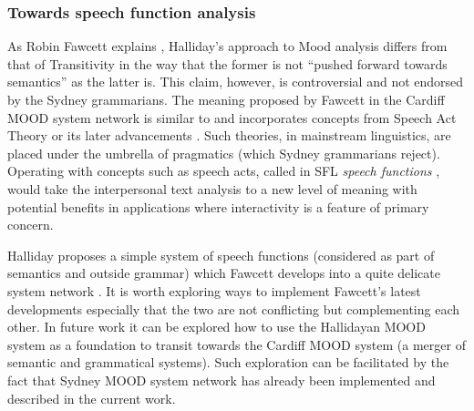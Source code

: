 \subsubsection{Towards speech function analysis}

    As Robin Fawcett explains \citep{Fawcett2011}, Halliday's approach to Mood analysis differs from that of Transitivity in the way that the former is not ``pushed forward towards semantics'' as the latter is. This claim, however, is controversial and not endorsed by the Sydney grammarians. %
    The meaning proposed by Fawcett in the Cardiff MOOD system network is similar to and incorporates concepts from Speech Act Theory \citep{Austin1975} or its later advancements \citep{Searle1969}. Such theories, in mainstream linguistics, are placed under the umbrella of pragmatics (which Sydney grammarians reject). Operating with concepts such as speech acts, called in SFL \textit{speech functions} \citep{Hasan84-ways}, would take the interpersonal text analysis to a new level of meaning with potential benefits in applications where interactivity is a feature of primary concern.
    

    Halliday proposes a simple system of speech functions \citep[136]{Halliday2013} (considered as part of semantics and outside grammar) which Fawcett develops into a quite delicate system network \citep{Fawcett2011}. It is worth exploring ways to implement Fawcett's latest developments especially that the two are not conflicting but complementing each other. In future work it can be explored how to use the Hallidayan MOOD system as a foundation to transit towards the Cardiff MOOD system (a merger of semantic and grammatical systems). Such exploration can be facilitated by the fact that Sydney MOOD system network has already been implemented and described in the current work.

